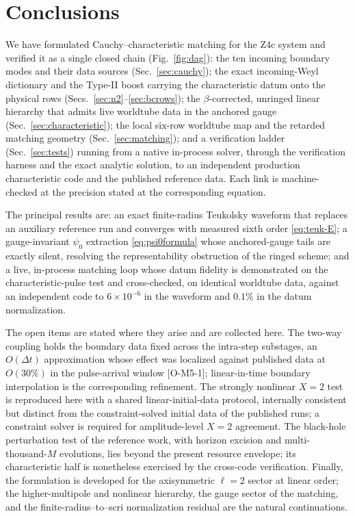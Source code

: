 \section{Conclusions}
\label{sec:conclusions}

We have formulated Cauchy--characteristic matching for the Z4c system
and verified it as a single closed chain
(Fig.~\ref{fig:dag}): the ten incoming boundary modes and their data
sources (Sec.~\ref{sec:cauchy}); the exact incoming-Weyl dictionary and
the Type-II boost carrying the characteristic datum onto the physical
rows (Secs.~\ref{sec:n2}--\ref{sec:bcrows}); the $\beta$-corrected,
unringed linear hierarchy that admits live worldtube data in the
anchored gauge (Sec.~\ref{sec:characteristic}); the local six-row
worldtube map and the retarded matching geometry
(Sec.~\ref{sec:matching}); and a verification ladder
(Sec.~\ref{sec:tests}) running from a native in-process solver, through
the verification harness and the exact analytic solution, to an
independent production characteristic code and the published reference
data. Each link is machine-checked at the precision stated at the
corresponding equation.

The principal results are: an exact finite-radius Teukolsky waveform
that replaces an auxiliary reference run and converges with measured
sixth order \eqref{eq:teuk-E}; a gauge-invariant $\psi_0$ extraction
\eqref{eq:psi0formula} whose anchored-gauge tails are exactly silent,
resolving the representability obstruction of the ringed scheme; and a
live, in-process matching loop whose datum fidelity is demonstrated on
the characteristic-pulse test and cross-checked, on identical worldtube
data, against an independent code to $6\times10^{-6}$ in the waveform
and $0.1\%$ in the datum normalization.

The open items are stated where they arise and are collected here. The
two-way coupling holds the boundary data fixed across the intra-step
substages, an $O(\Delta t)$ approximation whose effect was localized
against published data at $O(30\%)$ in the pulse-arrival window
[O-M5-1]; linear-in-time boundary interpolation is the corresponding
refinement. The strongly nonlinear $X=2$ test is reproduced here with a
shared linear-initial-data protocol, internally consistent but distinct
from the constraint-solved initial data of the published runs; a
constraint solver is required for amplitude-level $X=2$ agreement. The
black-hole perturbation test of the reference work, with horizon
excision and multi-thousand-$M$ evolutions, lies beyond the present
resource envelope; its characteristic half is nonetheless exercised by
the cross-code verification. Finally, the formulation is developed for
the axisymmetric $\ell=2$ sector at linear order; the higher-multipole
and nonlinear hierarchy, the gauge sector of the matching, and the
finite-radius--to--scri normalization residual are the natural
continuations.
